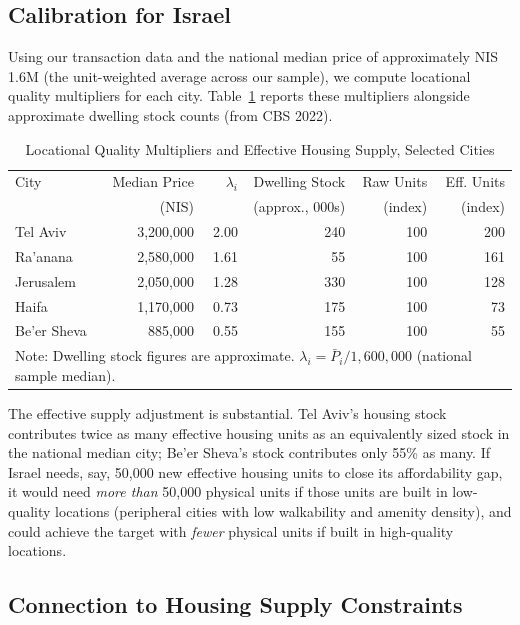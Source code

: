 \documentclass[12pt,a4paper]{article}
\begin{document}
\subsection{Calibration for Israel}
\label{sec:theory_calib}

Using our transaction data and the national median price of approximately
NIS 1.6M (the unit-weighted average across our sample), we compute locational
quality multipliers for each city.  Table~\ref{tab:multipliers} reports these
multipliers alongside approximate dwelling stock counts (from CBS 2022).

\begin{table}[H]
\centering
\caption{Locational Quality Multipliers and Effective Housing Supply, Selected Cities}
\label{tab:multipliers}
\small
\begin{tabular}{lrrrrr}
\toprule
City & Median Price & $\lambda_i$ & Dwelling Stock & Raw Units & Eff. Units \\
     & (NIS)       &              & (approx., 000s)  &(index)  & (index) \\
\midrule
Tel Aviv      & 3,200,000 & 2.00 & 240 & 100 & 200 \\
Ra'anana      & 2,580,000 & 1.61 &  55 & 100 & 161 \\
Jerusalem     & 2,050,000 & 1.28 & 330 & 100 & 128 \\
Haifa         & 1,170,000 & 0.73 & 175 & 100 &  73 \\
Be'er Sheva   &   885,000 & 0.55 & 155 & 100 &  55 \\
\midrule
\multicolumn{6}{l}{\footnotesize Note: Dwelling stock figures are approximate.
  $\lambda_i = \bar{P}_i / 1{,}600{,}000$ (national sample median).} \\
\bottomrule
\end{tabular}
\end{table}

The effective supply adjustment is substantial.  Tel Aviv's housing stock
contributes twice as many effective housing units as an equivalently sized
stock in the national median city; Be'er Sheva's stock contributes only 55\% as
many.  If Israel needs, say, 50,000 new effective housing units to close its
affordability gap, it would need \textit{more than} 50,000 physical units if
those units are built in low-quality locations (peripheral cities with low
walkability and amenity density), and could achieve the target with
\textit{fewer} physical units if built in high-quality locations.

\subsection{Connection to Housing Supply Constraints}
\label{sec:theory_supply}
\end{document}

